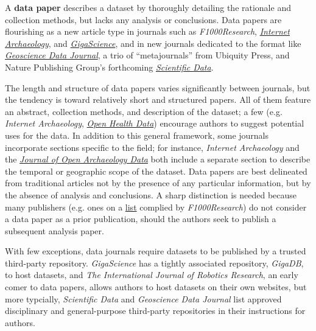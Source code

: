 \documentclass[10pt,twocolumn]{article}
\begin{document}
A \textbf{data paper} describes a dataset by thoroughly detailing the rationale and collection methods, but lacks any analysis or conclusions.\cite{newman_data_2009} 
Data papers are flourishing as a new article type in journals such as \emph{F1000Research}, \href{http://www.internetarchaeology.org/}{\emph{Internet Archaeology}}, and \href{http://www.gigasciencejournal.com/}{\emph{GigaScience}}\cite{gigascience}, and in new journals dedicated to the format like \href{http://onlinelibrary.wiley.com/journal/10.1002/%28ISSN%292049-6060}{\emph{Geoscience Data Journal}}\cite{geoscience_data_journal}, a trio of ``metajournals'' from Ubiquity Press, and Nature Publishing Group's forthcoming \href{http://www.nature.com/scientificdata/}{\emph{Scientific Data}}.

The length and structure of data papers varies significantly between journals, but the tendency is toward relatively short and structured papers.
All of them feature an abstract, collection methods, and description of the dataset; a few (e.g. \emph{Internet Archaeology}, \href{http://openhealthdata.metajnl.com/about/submissions#authorGuidelines}{\emph{Open Health Data}}) encourage authors to suggest potential uses for the data.
In addition to this general framework, some journals incorporate sections specific to the field; for instance, \emph{Internet Archaeology} and the \href{http://openarchaeologydata.metajnl.com/}{\emph{Journal of Open Archaeology Data}} both include a separate section to describe the  temporal or geographic scope of the dataset.
Data papers are best delineated from traditional articles not by the presence of any particular information, but by the absence of analysis and conclusions.
A sharp distinction is needed because many publishers (e.g. ones on a \href{https://f1000research.com/data-policies}{list} complied by \emph{F1000Research}) do not consider a data paper as a prior publication, should the authors seek to publish a subsequent analysis paper.

With few exceptions, data journals require datasets to be published by a trusted third-party repository. 
\emph{GigaScience} has a tightly associated repository, \emph{GigaDB}, to host datasets, and \emph{The International Journal of Robotics Research}\cite{international_journal_of_robotics_research}, an early comer to data papers\cite{newman_data_2009}, allows authors to host datasets on their own websites, but more typcially, \emph{Scientific Data} and \emph{Geoscience Data Journal} list approved disciplinary and general-purpose third-party repositories in their instructions for authors.
\end{document}
